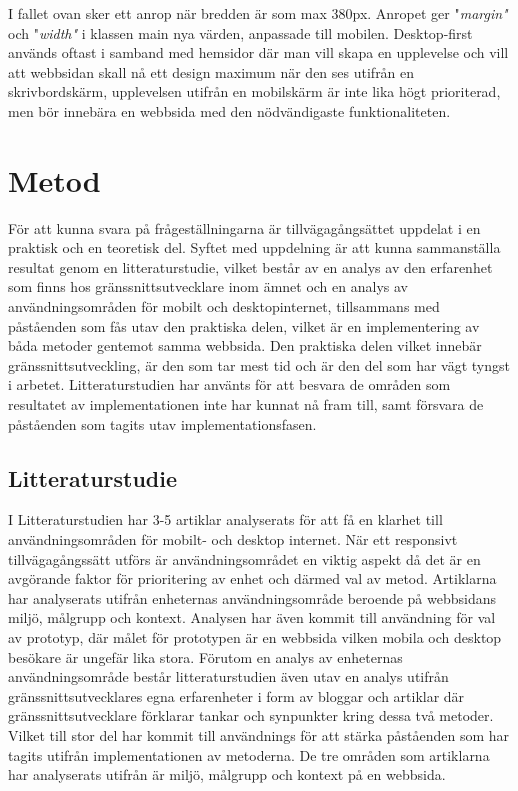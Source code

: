 \documentclass[11pt]{article}
\begin{document}
I fallet ovan sker ett anrop när bredden är som max 380px. Anropet ger "\textit{margin"} och "\textit{width"} i klassen main nya värden, anpassade till mobilen.  Desktop-first används oftast i samband med hemsidor där man vill skapa en upplevelse och vill att webbsidan skall nå ett design maximum när den ses utifrån en skrivbordskärm, upplevelsen utifrån en mobilskärm är inte lika högt prioriterad, men bör innebära en webbsida med den nödvändigaste funktionaliteten.
\newpage

\section{Metod}
För att kunna svara på frågeställningarna är tillvägagångsättet uppdelat i en praktisk och en teoretisk del. Syftet med uppdelning är att kunna sammanställa resultat genom en litteraturstudie, vilket består av en analys av den erfarenhet som finns hos gränssnittsutvecklare inom ämnet och en analys av användningsområden för mobilt och desktopinternet, tillsammans med påståenden som fås utav den praktiska delen, vilket är en implementering av båda metoder gentemot samma webbsida. Den praktiska delen vilket innebär gränssnittsutveckling, är den som tar mest tid och är den del som har vägt tyngst i arbetet. Litteraturstudien har använts för att besvara de områden som resultatet av implementationen inte har kunnat nå fram till, samt försvara de påståenden som tagits utav implementationsfasen.


\subsection{Litteraturstudie}
I Litteraturstudien har 3-5 artiklar analyserats för att få en klarhet till användningsområden för mobilt- och desktop internet. När ett responsivt tillvägagångssätt utförs är användningsområdet en viktig aspekt då det är en avgörande faktor för prioritering av enhet och därmed val av metod. Artiklarna har analyserats utifrån enheternas användningsområde beroende på webbsidans miljö, målgrupp och kontext. Analysen har även kommit till användning för val av prototyp, där målet för prototypen är en webbsida vilken mobila och desktop besökare är ungefär lika stora. Förutom en analys av enheternas användningsområde består litteraturstudien även utav en analys utifrån gränssnittsutvecklares egna erfarenheter i form av bloggar och artiklar där gränssnittsutvecklare förklarar tankar och synpunkter kring dessa två metoder. Vilket till stor del har kommit till användnings för att stärka påståenden som har tagits utifrån implementationen av metoderna. De tre områden som artiklarna har analyserats utifrån är miljö, målgrupp och kontext på en webbsida.
\end{document}
